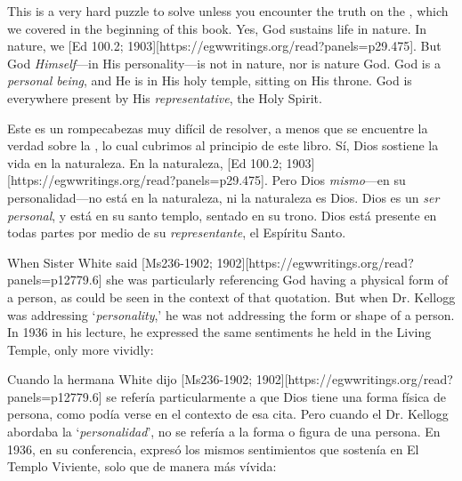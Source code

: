 This is a very hard puzzle to solve unless you encounter the truth on the , which we covered in the beginning of this book. Yes, God sustains life in nature. In nature, we [Ed 100.2; 1903][https://egwwritings.org/read?panels=p29.475]. But God \textit{Himself}—in His personality—is not in nature, nor is nature God. God is a \textit{personal being}, and He is in His holy temple, sitting on His throne. God is everywhere present by His \textit{representative}, the Holy Spirit.


Este es un rompecabezas muy difícil de resolver, a menos que se encuentre la verdad sobre la , lo cual cubrimos al principio de este libro. Sí, Dios sostiene la vida en la naturaleza. En la naturaleza, [Ed 100.2; 1903][https://egwwritings.org/read?panels=p29.475]. Pero Dios \textit{mismo}—en su personalidad—no está en la naturaleza, ni la naturaleza es Dios. Dios es un \textit{ser personal}, y está en su santo templo, sentado en su trono. Dios está presente en todas partes por medio de su \textit{representante}, el Espíritu Santo.


When Sister White said [Ms236-1902; 1902][https://egwwritings.org/read?panels=p12779.6] she was particularly referencing God having a physical form of a person, as could be seen in the context of that quotation. But when Dr. Kellogg was addressing ‘\textit{personality},’ he was not addressing the form or shape of a person. In 1936 in his lecture, he expressed the same sentiments he held in the Living Temple, only more vividly:


Cuando la hermana White dijo [Ms236-1902; 1902][https://egwwritings.org/read?panels=p12779.6] se refería particularmente a que Dios tiene una forma física de persona, como podía verse en el contexto de esa cita. Pero cuando el Dr. Kellogg abordaba la ‘\textit{personalidad}’, no se refería a la forma o figura de una persona. En 1936, en su conferencia, expresó los mismos sentimientos que sostenía en El Templo Viviente, solo que de manera más vívida:




